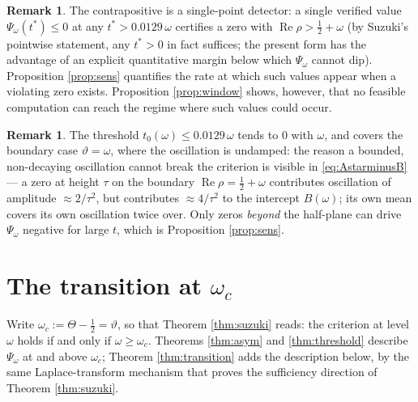 \documentclass[11pt,reqno]{amsart}
\theoremstyle{plain}
\theoremstyle{definition}
\newtheorem{remark}[theorem]{Remark}
\newcommand{\Rp}{\operatorname{Re}}
\begin{document}
\begin{remark}\label{rem:detector}
The contrapositive is a single-point detector: a single verified value $\Psi_\omega(t^{*})\le0$ at
any $t^{*}>0.0129\,\omega$ certifies a zero with $\Rp\rho>\tfrac12+\omega$ (by Suzuki's pointwise
statement, any $t^{*}>0$ in fact suffices; the present form has the advantage of an explicit
quantitative margin below which $\Psi_\omega$ cannot dip). Proposition \ref{prop:sens} quantifies
the rate at which such values appear when a violating zero exists. Proposition \ref{prop:window}
shows, however, that no feasible computation can reach the regime where such values could occur.
\end{remark}

\begin{remark}
The threshold $t_0(\omega)\le0.0129\,\omega$ tends to $0$ with $\omega$, and covers the boundary
case $\vartheta=\omega$, where the oscillation is undamped: the reason a bounded, non-decaying
oscillation cannot break the criterion is visible in \eqref{eq:AstarminusB} --- a zero at height
$\tau$ on the boundary $\Rp\rho=\tfrac12+\omega$ contributes oscillation of amplitude
$\approx2/\tau^{2}$, but contributes $\approx4/\tau^{2}$ to the intercept $B(\omega)$; its own mean
covers its own oscillation twice over. Only zeros \emph{beyond} the half-plane can drive
$\Psi_\omega$ negative for large $t$, which is Proposition \ref{prop:sens}.
\end{remark}

\section{The transition at $\omega_c$}\label{sec:transition}

Write $\omega_c:=\Theta-\tfrac12=\vartheta$, so that Theorem \ref{thm:suzuki} reads: the criterion
at level $\omega$ holds if and only if $\omega\ge\omega_c$. Theorems \ref{thm:asym} and
\ref{thm:threshold} describe $\Psi_\omega$ at and above $\omega_c$; Theorem \ref{thm:transition}
adds the description below, by the same Laplace-transform mechanism that proves the sufficiency
direction of Theorem \ref{thm:suzuki}.
\end{document}
